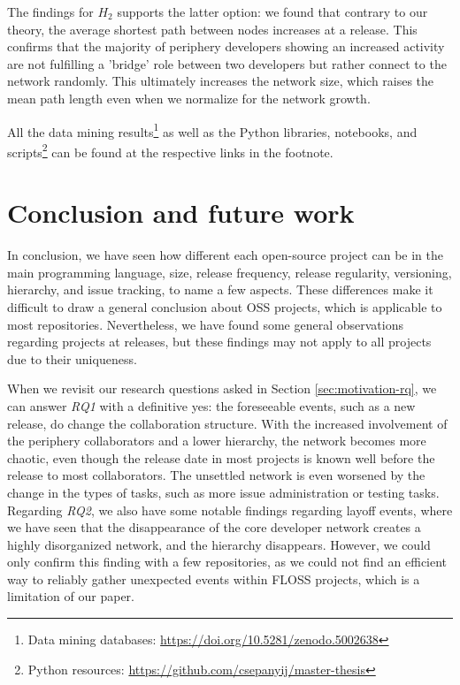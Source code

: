 The findings for $H_2$ supports the latter option: we found that contrary to our theory, the average shortest path between nodes increases at a release. This confirms that the majority of periphery developers showing an increased activity are not fulfilling a 'bridge' role between two developers but rather connect to the network randomly. This ultimately increases the network size, which raises the mean path length even when we normalize for the network growth.

All the data mining results\footnote{Data mining databases: \url{https://doi.org/10.5281/zenodo.5002638}} as well as the Python libraries, notebooks, and scripts\footnote{Python resources: \url{https://github.com/csepanyij/master-thesis}} can be found at the respective links in the footnote.

\section{Conclusion and future work}

In conclusion, we have seen how different each open-source project can be in the main programming language, size, release frequency, release regularity, versioning, hierarchy, and issue tracking, to name a few aspects. These differences make it difficult to draw a general conclusion about OSS projects, which is applicable to most repositories. Nevertheless, we have found some general observations regarding projects at releases, but these findings may not apply to all projects due to their uniqueness.

When we revisit our research questions asked in Section \ref{sec:motivation-rq}, we can answer \textit{RQ1} with a definitive yes: the foreseeable events, such as a new release, do change the collaboration structure. With the increased involvement of the periphery collaborators and a lower hierarchy, the network becomes more chaotic, even though the release date in most projects is known well before the release to most collaborators. The unsettled network is even worsened by the change in the types of tasks, such as more issue administration or testing tasks. Regarding \textit{RQ2}, we also have some notable findings regarding layoff events, where we have seen that the disappearance of the core developer network creates a highly disorganized network, and the hierarchy disappears. However, we could only confirm this finding with a few repositories, as we could not find an efficient way to reliably gather unexpected events within FLOSS projects, which is a limitation of our paper.

